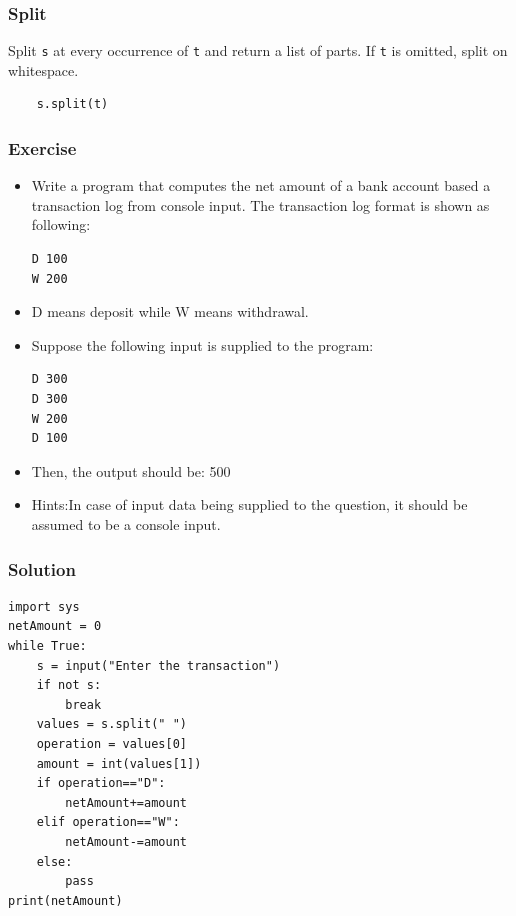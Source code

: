 



\begin{frame}[fragile]\frametitle{Split}
    Split \texttt{s} at every occurrence of \texttt{t} and return a list of parts. If \texttt{t} is omitted, split on whitespace.
  \begin{lstlisting}
  	s.split(t)
  \end{lstlisting}
\end{frame}

\begin{frame}[fragile]\frametitle{Exercise}
  \begin{itemize}
  \item Write a program that computes the net amount of a bank account based a transaction log from console input. The transaction log format is shown as following:
    \begin{lstlisting}
D 100
W 200
  \end{lstlisting}
  \item D means deposit while W means withdrawal.
  \item Suppose the following input is supplied to the program:
    \begin{lstlisting}
D 300
D 300
W 200
D 100
  \end{lstlisting}
  \item Then, the output should be: 500
  \item  Hints:In case of input data being supplied to the question, it should be assumed to be a console input.
  \end{itemize}  
\end{frame}

\begin{frame}[fragile]\frametitle{Solution}
  \begin{lstlisting}
import sys
netAmount = 0
while True:
    s = input("Enter the transaction")
    if not s:
        break
    values = s.split(" ")
    operation = values[0]
    amount = int(values[1])
    if operation=="D":
        netAmount+=amount
    elif operation=="W":
        netAmount-=amount
    else:
        pass
print(netAmount)
  \end{lstlisting}
\end{frame}



